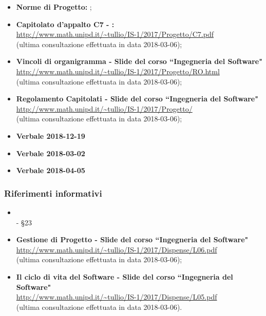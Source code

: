             \begin{itemize}
                \item \textbf{Norme di Progetto:} \vNormeDiProgetto{};
                \item \textbf{Capitolato d'appalto C7 - \ProjectName:} \\
                \url{http://www.math.unipd.it/~tullio/IS-1/2017/Progetto/C7.pdf}\\
				(ultima consultazione effettuata in data 2018-03-06);
                \item \textbf{Vincoli di organigramma - Slide del corso ``Ingegneria del Software"}\\
                \url{http://www.math.unipd.it/~tullio/IS-1/2017/Progetto/RO.html}\\
				(ultima consultazione effettuata in data 2018-03-06);
                \item \textbf{Regolamento Capitolati - Slide del corso ``Ingegneria del Software"} \\
                \url{http://www.math.unipd.it/~tullio/IS-1/2017/Progetto/}\\
				(ultima consultazione effettuata in data 2018-03-06);
                \item \textbf{Verbale 2018-12-19}
                \item \textbf{Verbale 2018-03-02}
                \item \textbf{Verbale 2018-04-05}
            \end{itemize}

        \subsubsection{Riferimenti informativi}

            \begin{itemize}
                \item{}\\
				- \S 23 
				
                \item \textbf{Gestione di Progetto - Slide del corso ``Ingegneria del Software"} \\
                \url{http://www.math.unipd.it/~tullio/IS-1/2017/Dispense/L06.pdf}\\
				(ultima consultazione effettuata in data 2018-03-06);

                \item \textbf{Il ciclo di vita del Software - Slide del corso ``Ingegneria del Software"}
                \\
                \url{http://www.math.unipd.it/~tullio/IS-1/2017/Dispense/L05.pdf}\\
				(ultima consultazione effettuata in data 2018-03-06).
            \end{itemize}

